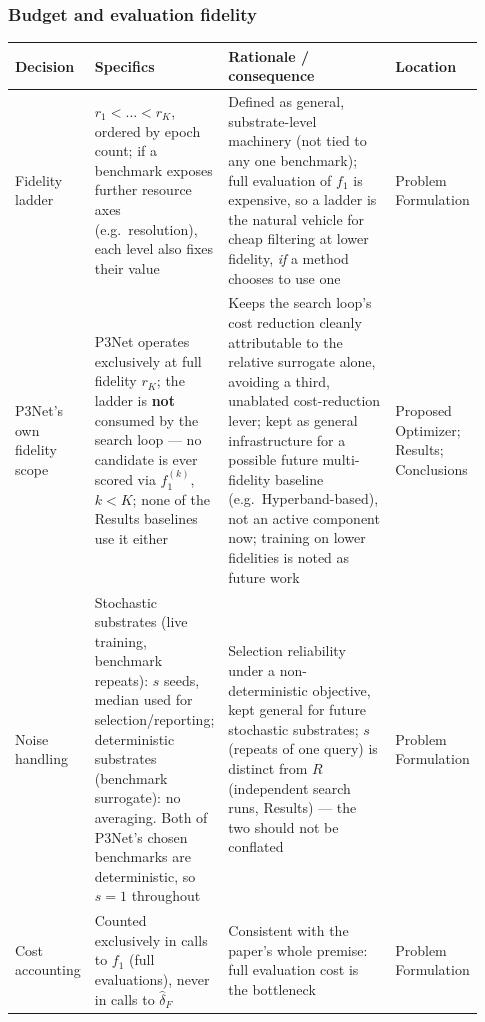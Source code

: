 \subsubsection*{Budget and evaluation fidelity}
\begin{longtable}{p{0.16\linewidth} p{0.28\linewidth} p{0.36\linewidth} p{0.13\linewidth}}
\toprule
\textbf{Decision} & \textbf{Specifics} & \textbf{Rationale / consequence} & \textbf{Location} \\
\midrule
\endhead
Fidelity ladder & $r_1<\dots<r_K$, ordered by epoch count; if a benchmark exposes further resource axes (e.g.\ resolution), each level also fixes their value & Defined as general, substrate-level machinery (not tied to any one benchmark); full evaluation of $f_1$ is expensive, so a ladder is the natural vehicle for cheap filtering at lower fidelity, \emph{if} a method chooses to use one & Problem Formulation \\
P3Net's own fidelity scope & P3Net operates exclusively at full fidelity $r_K$; the ladder is \textbf{not} consumed by the search loop --- no candidate is ever scored via $f_1^{(k)}$, $k<K$; none of the Results baselines use it either & Keeps the search loop's cost reduction cleanly attributable to the relative surrogate alone, avoiding a third, unablated cost-reduction lever; kept as general infrastructure for a possible future multi-fidelity baseline (e.g.\ Hyperband-based), not an active component now; training on lower fidelities is noted as future work & Proposed Optimizer; Results; Conclusions \\
Noise handling & Stochastic substrates (live training, benchmark repeats): $s$ seeds, median used for selection/reporting; deterministic substrates (benchmark surrogate): no averaging. Both of P3Net's chosen benchmarks are deterministic, so $s=1$ throughout & Selection reliability under a non-deterministic objective, kept general for future stochastic substrates; $s$ (repeats of one query) is distinct from $R$ (independent search runs, Results) --- the two should not be conflated & Problem Formulation \\
Cost accounting & Counted exclusively in calls to $f_1$ (full evaluations), never in calls to $\hat{\delta}_F$ & Consistent with the paper's whole premise: full evaluation cost is the bottleneck & Problem Formulation \\
\bottomrule
\end{longtable}

